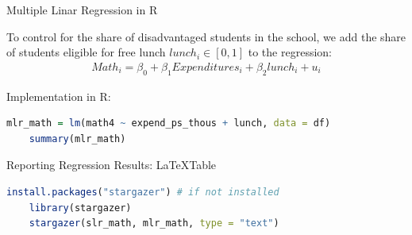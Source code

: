 \documentclass[11pt, aspectratio = 169]{beamer}
\begin{document}
\begin{frame}[fragile]{Multiple Linar Regression in R}

To control for the share of disadvantaged students in the school, we add the share of students eligible for free lunch $lunch_ i \in [0,1]$ to the regression:
\begin{align*}
    Math_i = \beta_0 + \beta_1 Expenditures_i + \beta_2 lunch_i + u_i
\end{align*}

\pause
Implementation in R:

\begin{lstlisting}[language=R]
    mlr_math = lm(math4 ~ expend_ps_thous + lunch, data = df)
    summary(mlr_math)
\end{lstlisting}

\end{frame}

\begin{frame}[fragile]{Reporting Regression Results: \LaTeX Table}
\begin{lstlisting}[language=R]
    install.packages("stargazer") # if not installed
    library(stargazer)
    stargazer(slr_math, mlr_math, type = "text")
\end{lstlisting}
\end{frame}
\end{document}
